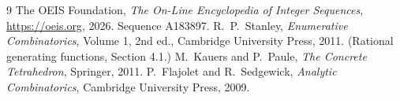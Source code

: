 \documentclass[11pt,a4paper]{article}
\theoremstyle{plain}
\theoremstyle{definition}
\begin{document}
\begin{thebibliography}{9}
 The OEIS Foundation, \emph{The On-Line Encyclopedia of Integer
Sequences}, \url{https://oeis.org}, 2026. Sequence A183897.
 R.~P.~Stanley, \emph{Enumerative Combinatorics}, Volume 1, 2nd ed.,
Cambridge University Press, 2011. (Rational generating functions, Section 4.1.)
 M.~Kauers and P.~Paule, \emph{The Concrete Tetrahedron}, Springer, 2011.
 P.~Flajolet and R.~Sedgewick, \emph{Analytic Combinatorics}, Cambridge
University Press, 2009.
\end{thebibliography}
\end{document}
